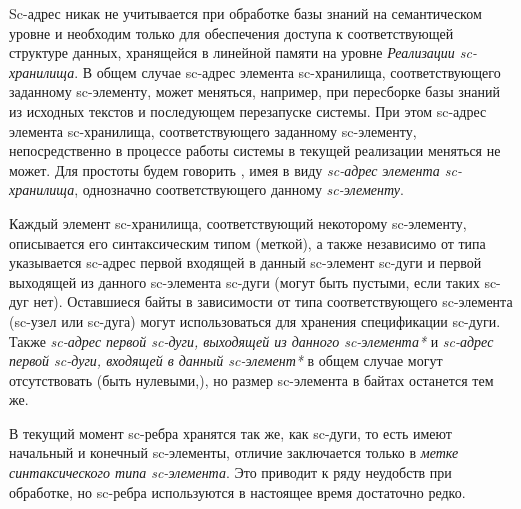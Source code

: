 Sc-адрес никак не учитывается при обработке базы знаний на семантическом уровне и необходим только для обеспечения
доступа к соответствующей структуре данных, хранящейся в линейной памяти на уровне \textit{Реализации sc-хранилища}.
В общем случае sc-адрес элемента sc-хранилища, соответствующего заданному sc-элементу, может меняться, например, при
пересборке базы знаний из исходных текстов и последующем перезапуске системы. При этом sc-адрес элемента sc-хранилища,
соответствующего заданному sc-элементу, непосредственно в процессе работы системы в текущей реализации меняться не может.
Для простоты будем говорить , имея в виду \textit{sc-адрес} \textit{элемента sc-хранилища},
однозначно соответствующего данному \textit{sc-элементу}.

Каждый элемент sc-хранилища, соответствующий некоторому sc-элементу, описывается его синтаксическим типом (меткой), а
также независимо от типа указывается sc-адрес первой входящей в данный sc-элемент sc-дуги и первой выходящей из данного
sc-элемента sc-дуги (могут быть пустыми, если таких sc-дуг нет). Оставшиеся байты в зависимости от типа соответствующего
sc-элемента (sc-узел или sc-дуга) могут использоваться для хранения спецификации sc-дуги. Также \textit{sc-адрес первой
sc-дуги, выходящей из данного sc-элемента*} и \textit{sc-адрес первой sc-дуги, входящей в данный sc-элемент*} в общем
случае могут отсутствовать (быть нулевыми,), но размер sc-элемента в байтах останется тем же.

В текущий момент sc-ребра хранятся так же, как sc-дуги, то есть имеют начальный и конечный sc-элементы, отличие
заключается только в \textit{метке синтаксического типа sc-элемента}. Это приводит к ряду неудобств при обработке,
но sc-ребра используются в настоящее время достаточно редко.

